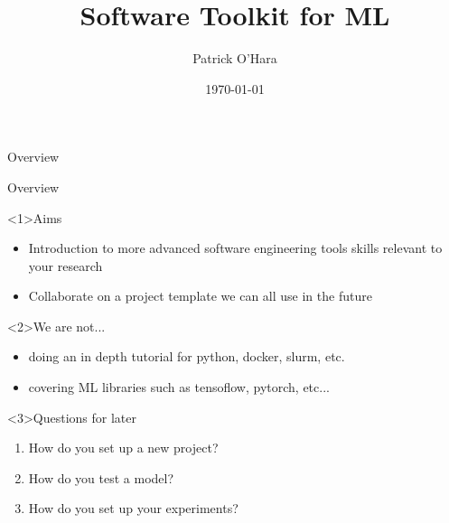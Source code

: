 \documentclass[t]{beamer}
\title{Software Toolkit for ML}
\date{\today}
\author{Patrick O'Hara}
\begin{document}
\begin{frame}
	\titlepage
\end{frame}

\begin{frame}{Overview}
    \tableofcontents
\end{frame}

\begin{frame}{Overview}
    \begin{block}<1>{Aims}
        \begin{itemize}
            \item Introduction to more advanced software engineering tools skills relevant to your research
            \item Collaborate on a project template we can all use in the future
        \end{itemize}
    \end{block}

    \begin{block}<2>{We are not...}
        \begin{itemize}
            \item doing an in depth tutorial for python, docker, slurm, etc.
            \item covering ML libraries such as tensoflow, pytorch, etc...
        \end{itemize}
    \end{block}

    \begin{block}<3>{Questions for later}
        \begin{enumerate}
            \item How do you set up a new project?
            \item How do you test a model?
            \item How do you set up your experiments?
        \end{enumerate}
    \end{block}
\end{frame}
\end{document}
